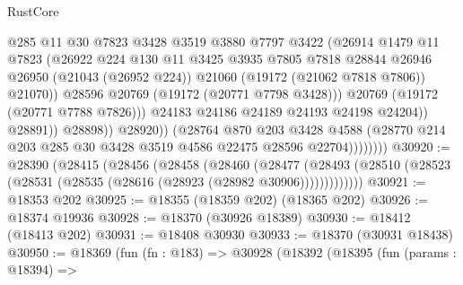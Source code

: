 \begin{lexlean}{RustCore}
\begin{coremodule}
                                    @285
                                    @11
                                    @30
                                    @7823
                                    @3428
                                    @3519
                                    @3880
                                    @7797
                                    @3422
                                    (@26914
                                      @1479
                                      @11
                                      @7823
                                      (@26922
                                        @224
                                        @130
                                        @11
                                        @3425
                                        @3935
                                        @7805
                                        @7818
                                        @28844
                                        @26946
                                        @26950
                                        (@21043 (@26952 @224))
                                        @21060
                                        (@19172 (@21062 @7818 @7806))
                                        @21070))
                                    @28596
                                    @20769
                                    (@19172 (@20771 @7798 @3428)))
                                  @20769
                                  (@19172 (@20771 @7788 @7826)))
                                @24183
                                @24186
                                @24189
                                @24193
                                @24198
                                @24204))
                            @28891))
                        @28898))
                    @28920))
                (@28764
                  @870
                  @203
                  @3428
                  @4588
                  (@28770 @214 @203 @285 @30 @3428 @3519 @4586 @22475 @28596 @22704))))))))
@30920 := @28390
    (@28415
      (@28456
        (@28458
          (@28460
            (@28477
              (@28493 (@28510 (@28523 (@28531 (@28535 (@28616 (@28923 (@28982 @30906)))))))))))))
@30921 := @18353 @202
@30925 := @18355 (@18359 @202) (@18365 @202)
@30926 := @18374 @19936
@30928 := @18370 (@30926 @18389)
@30930 := @18412 (@18413 @202)
@30931 := @18408 @30930
@30933 := @18370 (@30931 @18438)
@30950 := @18369
    (fun (fn : @183) =>
    @30928
      (@18392
        (@18395
          (fun (params : @18394) =>

\end{coremodule}
\end{lexlean}
